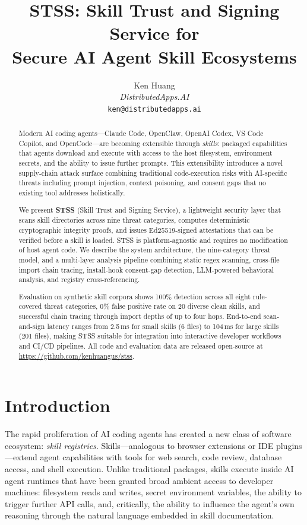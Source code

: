 \documentclass[11pt,twocolumn]{article}
\title{\textbf{STSS: Skill Trust and Signing Service for\\
Secure AI Agent Skill Ecosystems}}
\author{
  Ken Huang\\
  \textit{DistributedApps.AI}\\
  \texttt{ken@distributedapps.ai}
}
\date{}
\begin{document}
\maketitle
\thispagestyle{empty}

\begin{abstract}
Modern AI coding agents---Claude Code, OpenClaw, OpenAI Codex, VS Code Copilot,
and OpenCode---are becoming extensible through \emph{skills}: packaged
capabilities that agents download and execute with access to the host filesystem,
environment secrets, and the ability to issue further prompts. This extensibility
introduces a novel supply-chain attack surface combining traditional code-execution
risks with AI-specific threats including prompt injection, context poisoning,
and consent gaps that no existing tool addresses holistically.

We present \textbf{STSS} (Skill Trust and Signing Service), a lightweight
security layer that scans skill directories across nine threat categories,
computes deterministic cryptographic integrity proofs, and issues
Ed25519-signed attestations that can be verified before a skill is loaded.
STSS is platform-agnostic and requires no modification of host agent code.
We describe the system architecture, the nine-category threat model, and a
multi-layer analysis pipeline combining static regex scanning, cross-file import
chain tracing, install-hook consent-gap detection, LLM-powered behavioral
analysis, and registry cross-referencing.

Evaluation on synthetic skill corpora shows 100\% detection across all eight
rule-covered threat categories, 0\% false positive rate on 20 diverse clean
skills, and successful chain tracing through import depths of up to four hops.
End-to-end scan-and-sign latency ranges from 2.5\,ms for small skills
(6 files) to 104\,ms for large skills (201 files), making STSS suitable for
integration into interactive developer workflows and CI/CD pipelines. All
code and evaluation data are released open-source at
\url{https://github.com/kenhuangus/stss}.
\end{abstract}

\section{Introduction}
\label{sec:intro}

The rapid proliferation of AI coding agents has created a new class of
software ecosystem: \emph{skill registries}. Skills---analogous to browser
extensions or IDE plugins---extend agent capabilities with tools for web
search, code review, database access, and shell execution. Unlike traditional
packages, skills execute inside AI agent runtimes that have been granted broad
ambient access to developer machines: filesystem reads and writes, secret
environment variables, the ability to trigger further API calls, and, critically,
the ability to influence the agent's own reasoning through the natural language
embedded in skill documentation.
\end{document}
